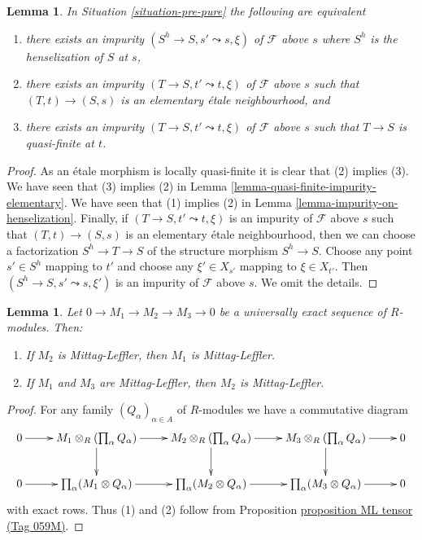\documentclass{amsart}
\theoremstyle{plain}
\newtheorem{lemma}[subsection]{Lemma}
\theoremstyle{definition}
\theoremstyle{remark}
\numberwithin{equation}{subsection}
\begin{document}
\begin{lemma}
\label{lemma-pure-along-X-s}
In Situation \ref{situation-pre-pure} the following
are equivalent
\begin{enumerate}
\item there exists an impurity $(S^h \to S, s' \leadsto s, \xi)$
of $\mathcal{F}$ above $s$ where $S^h$ is the henselization of $S$ at $s$,
\item there exists an impurity $(T \to S, t' \leadsto t, \xi)$
of $\mathcal{F}$ above $s$ such that $(T, t) \to (S, s)$ is an
elementary \'etale neighbourhood, and
\item there exists an impurity $(T \to S, t' \leadsto t, \xi)$
of $\mathcal{F}$ above $s$ such that $T \to S$ is quasi-finite at $t$.
\end{enumerate}
\end{lemma}

\begin{proof}
As an \'etale morphism is locally quasi-finite it is clear that
(2) implies (3). We have seen that (3) implies (2) in
Lemma \ref{lemma-quasi-finite-impurity-elementary}.
We have seen that (1) implies (2) in
Lemma \ref{lemma-impurity-on-henselization}.
Finally, if $(T \to S, t' \leadsto t, \xi)$ is an impurity
of $\mathcal{F}$ above $s$ such that $(T, t) \to (S, s)$ is an
elementary \'etale neighbourhood, then we can choose a factorization
$S^h \to T \to S$ of the structure morphism $S^h \to S$.
Choose any point $s' \in S^h$ mapping to $t'$ and choose any
$\xi' \in X_{s'}$ mapping to $\xi \in X_{t'}$. Then
$(S^h \to S, s' \leadsto s, \xi')$ is an impurity of
$\mathcal{F}$ above $s$. We omit the details.
\end{proof}


\begin{lemma}
\label{algebra-lemma-pure-submodule-ML}
Let $0 \to M_1 \to M_2 \to M_3 \to 0$ be a
universally exact sequence of $R$-modules.  Then:
\begin{enumerate}
\item If $M_2$ is Mittag-Leffler, then $M_1$ is Mittag-Leffler.
\item If $M_1$ and $M_3$ are Mittag-Leffler, then $M_2$ is Mittag-Leffler.
\end{enumerate}
\end{lemma}

\begin{proof}
For any family $(Q_{\alpha})_{\alpha \in A}$ of $R$-modules we have a
commutative diagram
$$
\xymatrix{
0 \ar[r] & M_1 \otimes_R (\prod_{\alpha} Q_{\alpha}) \ar[r] \ar[d] & M_2
\otimes_R (\prod_{\alpha} Q_{\alpha}) \ar[r] \ar[d] & M_3 \otimes_R
(\prod_{\alpha} Q_{\alpha}) \ar[r] \ar[d] & 0 \\
0 \ar[r] & \prod_{\alpha}(M_1 \otimes Q_{\alpha}) \ar[r] & \prod_{\alpha}(M_2
\otimes Q_{\alpha}) \ar[r] & \prod_{\alpha}(M_3 \otimes Q_{\alpha})\ar[r] & 0
}
$$
with exact rows. Thus (1) and (2) follow from
Proposition \href{https://stacks.math.columbia.edu/tag/059M}{proposition ML tensor (Tag 059M)}.
\end{proof}
\end{document}
